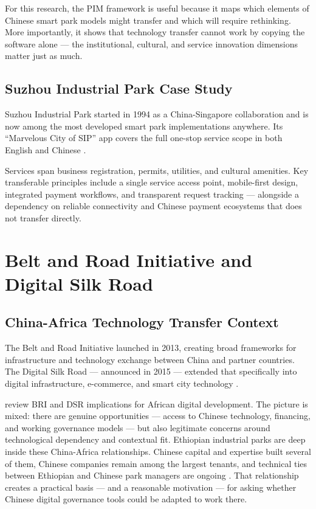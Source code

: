 For this research, the PIM framework is useful because it maps which elements of Chinese smart park models might transfer and which will require rethinking. More importantly, it shows that technology transfer cannot work by copying the software alone --- the institutional, cultural, and service innovation dimensions matter just as much.

\subsection{Suzhou Industrial Park Case Study}

Suzhou Industrial Park started in 1994 as a China-Singapore collaboration and is now among the most developed smart park implementations anywhere. Its ``Marvelous City of SIP'' app covers the full one-stop service scope in both English and Chinese \citep{PRNewswire2024}.

Services span business registration, permits, utilities, and cultural amenities. Key transferable principles include a single service access point, mobile-first design, integrated payment workflows, and transparent request tracking --- alongside a dependency on reliable connectivity and Chinese payment ecosystems that does not transfer directly.

\section{Belt and Road Initiative and Digital Silk Road}

\subsection{China-Africa Technology Transfer Context}

The Belt and Road Initiative launched in 2013, creating broad frameworks for infrastructure and technology exchange between China and partner countries. The Digital Silk Road --- announced in 2015 --- extended that specifically into digital infrastructure, e-commerce, and smart city technology \citep{ElKadi2024}.

\citet{deKluiver2024} review BRI and DSR implications for African digital development. The picture is mixed: there are genuine opportunities --- access to Chinese technology, financing, and working governance models --- but also legitimate concerns around technological dependency and contextual fit. Ethiopian industrial parks are deep inside these China-Africa relationships. Chinese capital and expertise built several of them, Chinese companies remain among the largest tenants, and technical ties between Ethiopian and Chinese park managers are ongoing \citep{Negesa2022, Brautigam2011}. That relationship creates a practical basis --- and a reasonable motivation --- for asking whether Chinese digital governance tools could be adapted to work there.

